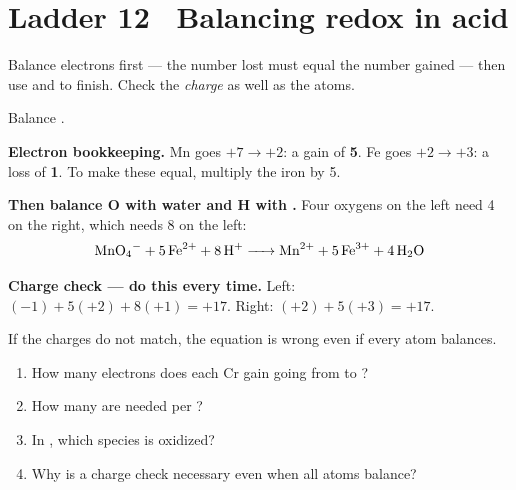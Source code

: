 \documentclass{apchem-worksheet}
\begin{document}
\section*{\sffamily Ladder 12 \textbullet\ Balancing redox in acid}

Balance electrons first --- the number lost must equal the number gained ---
then use  and  to finish. Check the \emph{charge} as well
as the atoms.

\begin{workedexample}
Balance
.

\textbf{Electron bookkeeping.} Mn goes $+7 \to +2$: a gain of \textbf{5}.
Fe goes $+2 \to +3$: a loss of \textbf{1}. To make these equal, multiply
the iron by 5.

\textbf{Then balance O with water and H with .} Four oxygens on the
left need 4  on the right, which needs 8  on the left:
\[ \ce{MnO4^- + 5Fe^2+ + 8H+ -> Mn^2+ + 5Fe^3+ + 4H2O} \]

\textbf{Charge check --- do this every time.}
Left: $(-1) + 5(+2) + 8(+1) = +17$. Right: $(+2) + 5(+3) = +17$.
\checkmark

If the charges do not match, the equation is wrong even if every atom
balances.
\end{workedexample}

\begin{yourturn}
\begin{enumerate}[leftmargin=*,itemsep=0.5em]
  \item How many electrons does each Cr gain going from  to
        ? \workspace[1.4cm]
  \item How many  are needed per ?
        \workspace[1.4cm]
  \item In , which species is oxidized?
        \workspace[1.4cm]
  \item Why is a charge check necessary even when all atoms balance?
        \workspace[1.8cm]
\end{enumerate}
\end{yourturn}
\end{document}
